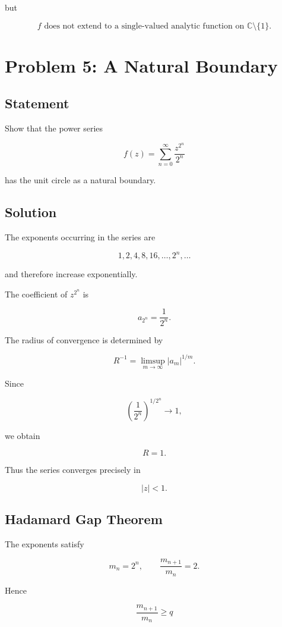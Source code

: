 \documentclass[12pt,a4paper]{article}
\theoremstyle{notespace}
\begin{document}
but

\[
\boxed{
	f
	\text{ does not extend to a single-valued analytic function on }
	\mathbb C\setminus\{1\}.
}
\]

\bigskip

\section{Problem 5: A Natural Boundary}

\subsection*{Statement}

Show that the power series

\[
f(z)
=
\sum_{n=0}^{\infty}
\frac{z^{2^n}}{2^n}
\]

has the unit circle as a natural boundary.

\subsection*{Solution}

The exponents occurring in the series are

\[
1,2,4,8,16,\ldots,2^n,\ldots
\]

and therefore increase exponentially.

The coefficient of \(z^{2^n}\) is

\[
a_{2^n}
=
\frac1{2^n}.
\]

The radius of convergence is determined by

\[
R^{-1}
=
\limsup_{m\to\infty}|a_m|^{1/m}.
\]

Since

\[
\left(\frac1{2^n}\right)^{1/2^n}
\longrightarrow 1,
\]

we obtain

\[
R=1.
\]

Thus the series converges precisely in

\[
|z|<1.
\]

\subsection*{Hadamard Gap Theorem}

The exponents satisfy

\[
m_n=2^n,
\qquad
\frac{m_{n+1}}{m_n}=2.
\]

Hence

\[
\frac{m_{n+1}}{m_n}\ge q
\]
\end{document}
